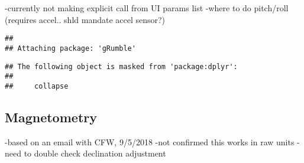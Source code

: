 \documentclass[]{article}
\begin{document}
-currently not making explicit call from UI params list -where to do
pitch/roll (requires accel.. shld mandate accel sensor?)

\begin{verbatim}
## 
## Attaching package: 'gRumble'
\end{verbatim}

\begin{verbatim}
## The following object is masked from 'package:dplyr':
## 
##     collapse
\end{verbatim}

\subsection{Magnetometry}\label{magnetometry}

-based on an email with CFW, 9/5/2018 -not confirmed this works in raw
units -need to double check declination adjustment
\end{document}
